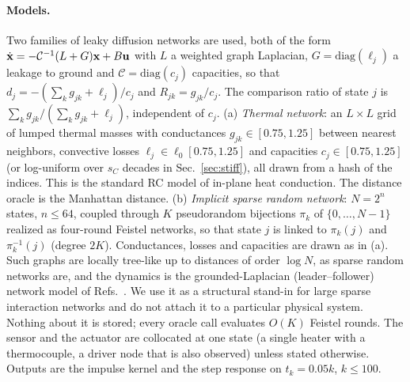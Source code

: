 \documentclass[aps,pra,superscriptaddress,floatfix,longbibliography,twocolumn]{revtex4-2}
\newcommand{\bx}{{\bf x}}
\newcommand{\bu}{{\bf u}}
\begin{document}
\paragraph*{Models.} Two families of leaky diffusion networks are used, both of the form $\dot\bx=-\mathcal{C}^{-1}(L+G)\bx+B\bu$ with $L$ a weighted graph Laplacian, $G=\mathrm{diag}(\ell_j)$ a leakage to ground and $\mathcal{C}=\mathrm{diag}(c_j)$ capacities, so that $d_j=-(\sum_kg_{jk}+\ell_j)/c_j$ and $R_{jk}=g_{jk}/c_j$. The comparison ratio of state $j$ is $\sum_kg_{jk}/(\sum_kg_{jk}+\ell_j)$, independent of $c_j$.
(a) \emph{Thermal network}: an $L\times L$ grid of lumped thermal masses with conductances $g_{jk}\in[0.75,1.25]$ between nearest neighbors, convective losses $\ell_j\in\ell_0[0.75,1.25]$ and capacities $c_j\in[0.75,1.25]$ (or log-uniform over $s_C$ decades in Sec.~\ref{sec:stiff}), all drawn from a hash of the indices. This is the standard RC model of in-plane heat conduction. The distance oracle is the Manhattan distance.
(b) \emph{Implicit sparse random network}: $N=2^n$ states, $n\le64$, coupled through $K$ pseudorandom bijections $\pi_k$ of $\{0,\dots,N-1\}$ realized as four-round Feistel networks, so that state $j$ is linked to $\pi_k(j)$ and $\pi_k^{-1}(j)$ (degree $2K$). Conductances, losses and capacities are drawn as in (a). Such graphs are locally tree-like up to distances of order $\log N$, as sparse random networks are, and the dynamics is the grounded-Laplacian (leader--follower) network model of Refs.~\cite{mesbahi2010,pasqualetti2014}. We use it as a structural stand-in for large sparse interaction networks and do not attach it to a particular physical system. Nothing about it is stored; every oracle call evaluates $O(K)$ Feistel rounds.
The sensor and the actuator are collocated at one state (a single heater with a thermocouple, a driver node that is also observed) unless stated otherwise. Outputs are the impulse kernel and the step response on $t_k=0.05k$, $k\le100$.
\end{document}
